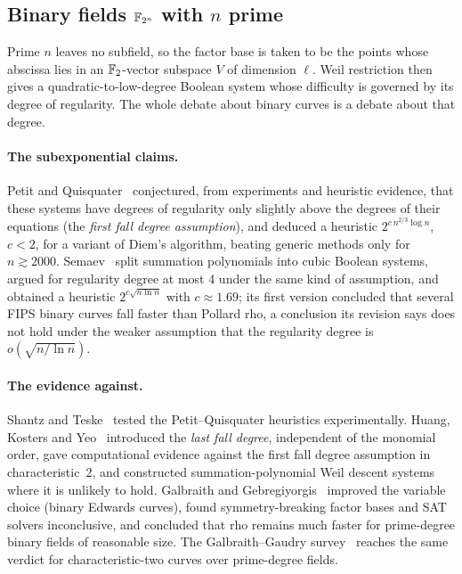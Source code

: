\subsection{Binary fields $\mathbb{F}_{2^n}$ with $n$ prime}

Prime $n$ leaves no subfield, so the factor base is taken to be the points
whose abscissa lies in an $\mathbb{F}_2$-vector subspace $V$ of dimension $\ell$.
Weil restriction then gives a quadratic-to-low-degree Boolean system whose
difficulty is governed by its degree of regularity. The whole debate about
binary curves is a debate about that degree.

\paragraph{The subexponential claims.} Petit and
Quisquater~\cite{petit2012} conjectured, from experiments and heuristic
evidence, that these systems have degrees of regularity only slightly above
the degrees of their equations (the \emph{first fall degree assumption}),
and deduced a heuristic $2^{c\,n^{2/3}\log n}$, $c<2$, for a variant of
Diem's algorithm, beating generic methods only for $n\gtrsim2000$.
Semaev~\cite{semaev2015} split summation polynomials into cubic Boolean
systems, argued for regularity degree at most 4 under the same kind of
assumption, and obtained a heuristic $2^{c\sqrt{n\ln n}}$ with
$c\approx1.69$; its first version concluded that several FIPS binary curves
fall faster than Pollard rho, a conclusion its revision says does not hold
under the weaker assumption that the regularity degree is
$o(\sqrt{n/\ln n})$.

\paragraph{The evidence against.} Shantz and Teske~\cite{shantz2013}
tested the Petit--Quisquater heuristics experimentally. Huang, Kosters and
Yeo~\cite{hky2015} introduced the \emph{last fall degree}, independent of
the monomial order, gave computational evidence against the first fall
degree assumption in characteristic~2, and constructed summation-polynomial
Weil descent systems where it is unlikely to hold. Galbraith and
Gebregiyorgis~\cite{galbraith2014} improved the variable choice (binary
Edwards curves), found symmetry-breaking factor bases and SAT solvers
inconclusive, and concluded that rho remains much faster for prime-degree
binary fields of reasonable size. The Galbraith--Gaudry
survey~\cite{galbraith2016} reaches the same verdict for characteristic-two
curves over prime-degree fields.


